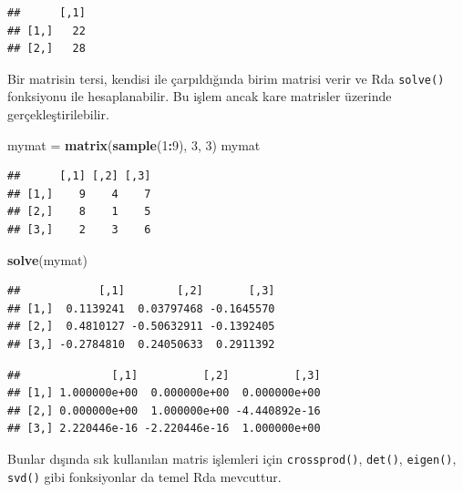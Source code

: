 \documentclass[]{book}
\newenvironment{Shaded}{\begin{snugshade}}{\end{snugshade}}
\newcommand{\DecValTok}[1]{\textcolor[rgb]{0.00,0.00,0.81}{#1}}
\newcommand{\KeywordTok}[1]{\textcolor[rgb]{0.13,0.29,0.53}{\textbf{#1}}}
\newcommand{\NormalTok}[1]{#1}
\newcommand{\OperatorTok}[1]{\textcolor[rgb]{0.81,0.36,0.00}{\textbf{#1}}}
\newcommand{\StringTok}[1]{\textcolor[rgb]{0.31,0.60,0.02}{#1}}
\begin{document}
\begin{verbatim}
##      [,1]
## [1,]   22
## [2,]   28
\end{verbatim}

Bir matrisin tersi, kendisi ile çarpıldığında birim matrisi verir ve Rda
\texttt{solve()} fonksiyonu ile hesaplanabilir. Bu işlem ancak kare
matrisler üzerinde gerçekleştirilebilir.

\begin{Shaded}
\begin{Highlighting}[]
\NormalTok{mymat =}\StringTok{ }\KeywordTok{matrix}\NormalTok{(}\KeywordTok{sample}\NormalTok{(}\DecValTok{1}\OperatorTok{:}\DecValTok{9}\NormalTok{), }\DecValTok{3}\NormalTok{, }\DecValTok{3}\NormalTok{)}
\NormalTok{mymat}
\end{Highlighting}
\end{Shaded}

\begin{verbatim}
##      [,1] [,2] [,3]
## [1,]    9    4    7
## [2,]    8    1    5
## [3,]    2    3    6
\end{verbatim}

\begin{Shaded}
\begin{Highlighting}[]
\KeywordTok{solve}\NormalTok{(mymat)}
\end{Highlighting}
\end{Shaded}

\begin{verbatim}
##            [,1]        [,2]       [,3]
## [1,]  0.1139241  0.03797468 -0.1645570
## [2,]  0.4810127 -0.50632911 -0.1392405
## [3,] -0.2784810  0.24050633  0.2911392
\end{verbatim}

\begin{Shaded}
\end{Shaded}

\begin{verbatim}
##              [,1]          [,2]          [,3]
## [1,] 1.000000e+00  0.000000e+00  0.000000e+00
## [2,] 0.000000e+00  1.000000e+00 -4.440892e-16
## [3,] 2.220446e-16 -2.220446e-16  1.000000e+00
\end{verbatim}

Bunlar dışında sık kullanılan matris işlemleri için
\texttt{crossprod()}, \texttt{det()}, \texttt{eigen()}, \texttt{svd()}
gibi fonksiyonlar da temel Rda mevcuttur.
\end{document}
